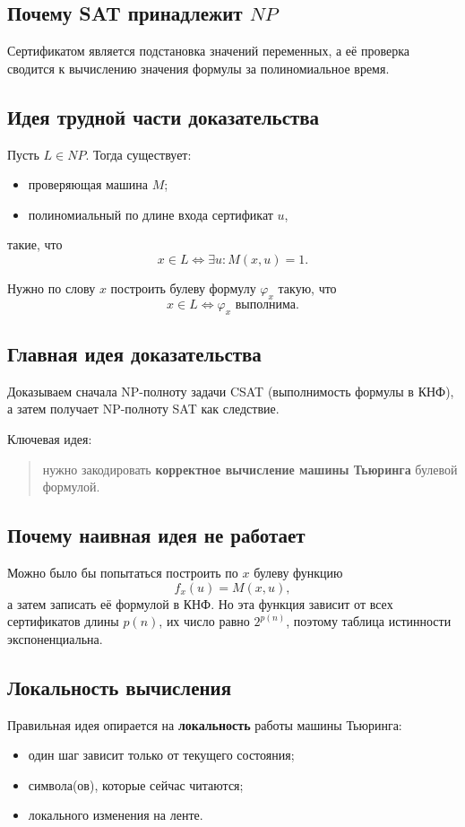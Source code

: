 \documentclass[12pt,a4paper]{article}
\theoremstyle{definition}
\theoremstyle{plain}
\begin{document}
\subsection{Почему \textsc{SAT} принадлежит \texorpdfstring{$NP$}{NP}}
Сертификатом является подстановка значений переменных, а её проверка сводится к вычислению значения формулы за полиномиальное время.

\subsection{Идея трудной части доказательства}
Пусть $L\in NP$. Тогда существует:
\begin{itemize}
\item проверяющая машина $M$;
\item полиномиальный по длине входа сертификат $u$,
\end{itemize}
такие, что
\[
x\in L \iff \exists u\colon M(x,u)=1.
\]

Нужно по слову $x$ построить булеву формулу $\varphi_x$ такую, что
\[
x\in L \iff \varphi_x \text{ выполнима}.
\]

\subsection{Главная идея доказательства}
Доказываем сначала NP-полноту задачи \textsc{CSAT} (выполнимость формулы в КНФ), а затем получает NP-полноту \textsc{SAT} как следствие.

Ключевая идея:
\begin{quote}
нужно закодировать \textbf{корректное вычисление машины Тьюринга} булевой формулой.
\end{quote}

\subsection{Почему наивная идея не работает}
Можно было бы попытаться построить по $x$ булеву функцию
\[
f_x(u)=M(x,u),
\]
а затем записать её формулой в КНФ. Но эта функция зависит от всех сертификатов длины $p(n)$, их число равно $2^{p(n)}$, поэтому таблица истинности экспоненциальна.

\subsection{Локальность вычисления}
Правильная идея опирается на \textbf{локальность} работы машины Тьюринга:
\begin{itemize}
\item один шаг зависит только от текущего состояния;
\item символа(ов), которые сейчас читаются;
\item локального изменения на ленте.
\end{itemize}
\end{document}
